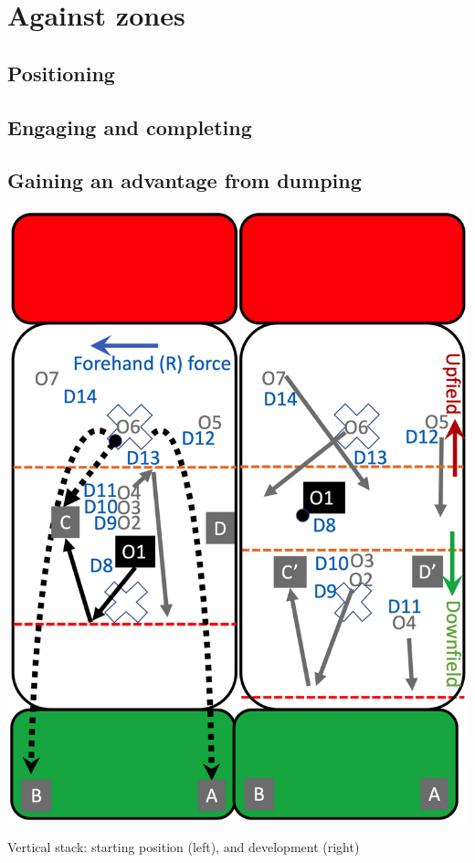 \documentclass{tufte-handout}
\begin{document}
\section{Against zones}
\subsection{Positioning}
\label{sec:zone_positioning}

\subsection{Engaging and completing}
\label{sec:zone_engaging}

\subsection{Gaining an advantage from dumping}
\label{sec:zone_advantage}





\begin{marginfigure}%
  \includegraphics[width=\linewidth]{O1-vertical}
  \caption{Vertical stack: 
  starting position (left),
  and development (right)}
  \label{fig:O1-vertical}
\end{marginfigure}
\end{document}
